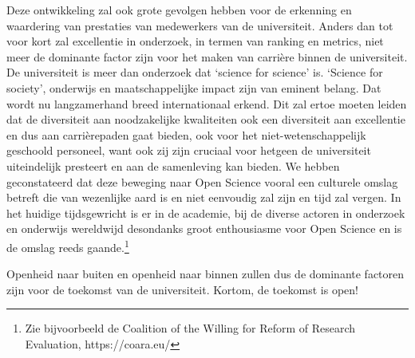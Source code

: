 \documentclass[empirical, authordate, ]{new-jote-article}
\begin{document}
	Deze ontwikkeling zal ook grote gevolgen hebben voor de erkenning en waardering van prestaties van medewerkers van de universiteit. Anders dan tot voor kort zal excellentie in onderzoek, in termen van ranking en metrics, niet meer de dominante factor zijn voor het maken van carrière binnen de universiteit. De universiteit is meer dan onderzoek dat ‘science for science' is. ‘Science for society', onderwijs en maatschappelijke impact zijn van eminent belang. Dat wordt nu langzamerhand breed internationaal erkend. Dit zal ertoe moeten leiden dat de diversiteit aan noodzakelijke kwaliteiten ook een diversiteit aan excellentie en dus aan carrièrepaden gaat bieden, ook voor het niet-wetenschappelijk geschoold personeel, want ook zij zijn cruciaal voor hetgeen de universiteit uiteindelijk presteert en aan de samenleving kan bieden. We hebben geconstateerd dat deze beweging naar Open Science vooral een culturele omslag betreft die van wezenlijke aard is en niet eenvoudig zal zijn en tijd zal vergen. In het huidige tijdsgewricht is er in de academie, bij de diverse actoren in onderzoek en onderwijs wereldwijd desondanks groot enthousiasme voor Open Science en is de omslag reeds gaande.\footnote{Zie bijvoorbeeld de Coalition of the Willing for Reform of Research Evaluation, https://coara.eu/}



	Openheid naar buiten en openheid naar binnen zullen dus de dominante factoren zijn voor de toekomst van de universiteit. Kortom, de toekomst is open!
\end{document}

